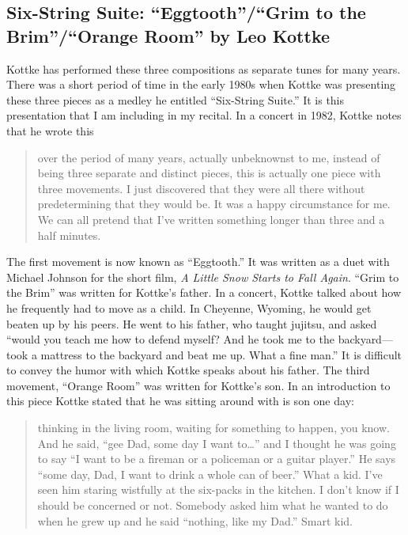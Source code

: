 \documentclass{tufte-handout}
\begin{document}
\subsection*{Six-String Suite: ``Eggtooth''/``Grim to the Brim''/``Orange Room'' by Leo Kottke}
Kottke has performed these three compositions as separate tunes for many
years. There was a short period of time in the early 1980s when Kottke was
presenting these three pieces as a medley he entitled ``Six-String Suite.'' It
is this presentation that I am including in my recital. In a concert in 1982, Kottke notes that he wrote this
\begin{quote}
over the period of many years, actually unbeknownst to me, instead of being three separate and distinct pieces, this is actually one piece with three movements. I just discovered that they were all there without predetermining that they would be. It was a happy circumstance for me. We can all pretend that I've written something longer than three and a half minutes.
\end{quote}
The first movement is now known as ``Eggtooth.'' It was written as a duet with
Michael Johnson for the short film, \emph{A Little Snow Starts to Fall
  Again}. ``Grim to the Brim'' was written for Kottke's father. In a concert,
Kottke talked about how he frequently had to move as a child. In Cheyenne,
Wyoming, he would get beaten up by his peers. He went to his father, who
taught jujitsu, and asked ``would you teach me how to defend myself? And he
took me to the backyard—took a mattress to the backyard and beat me up. What a
fine man.'' It is difficult to convey the humor with which Kottke speaks about
his father. The third movement, ``Orange Room'' was written for Kottke's son. In an introduction to this piece Kottke stated that he was sitting around with is son one day:
\begin{quote}
  thinking in the living room, waiting for something to happen, you know. And he said, ``gee Dad, some day I want to…'' and I thought he was going to say ``I want to be a fireman or a policeman or a guitar player.'' He says ``some day, Dad, I want to drink a whole can of beer.'' What a kid. I've seen him staring wistfully at the six-packs in the kitchen. I don't know if I should be concerned or not. Somebody asked him what he wanted to do when he grew up and he said ``nothing, like my Dad.'' Smart kid.
\end{quote}

\end{document}

